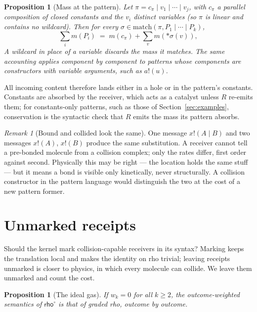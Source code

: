 \documentclass[11pt,a4paper]{article}
\theoremstyle{plain}
\newtheorem{proposition}[theorem]{Proposition}
\theoremstyle{definition}
\theoremstyle{remark}
\newtheorem{remark}[theorem]{Remark}
\newcommand{\rhoc}{\textsf{rho}}
\newcommand{\krho}{\textsf{rho}^{\circ}}
\newcommand{\match}{\mathrm{match}}
\begin{document}
\begin{proposition}[Mass at the pattern]\label{prop:mass}
Let $\pi = c_\pi \mid v_1 \mid \cdots \mid v_j$, with $c_\pi$ a parallel
composition of closed constants and the $v_i$ distinct variables (so $\pi$ is
linear and contains no wildcard). Then for every
$\sigma\in\match(\pi,P_1\mid\cdots\mid P_k)$,
\[
\textstyle\sum_i m(P_i) \;=\; m(c_\pi) + \sum_{v} m(*\sigma(v)),
\]
A wildcard in place of a variable discards the mass it matches. The same
accounting applies component by component to patterns whose components are
constructors with variable arguments, such as $a!(u)$.
\end{proposition}

All incoming content therefore lands either in a hole or in the pattern's
constants. Constants are absorbed by the receiver, which acts as a catalyst
unless $R$ re-emits them; for constants-only patterns, such as those of
Section~\ref{sec:examples}, conservation is the syntactic check that $R$ emits
the mass its pattern absorbs.

\begin{remark}[Bound and collided look the same]\label{rem:bound}
One message $x!(A\mid B)$ and two messages $x!(A)$, $x!(B)$ produce the same
substitution. A receiver cannot tell a pre-bonded molecule from a collision
complex; only the rates differ, first order against second. Physically this may
be right --- the location holds the same stuff --- but it means a bond is visible
only kinetically, never structurally. A collision constructor in the pattern
language would distinguish the two at the cost of a new pattern former.
\end{remark}

\section{Unmarked receipts}\label{sec:unmarked}

Should the kernel mark collision-capable receivers in its syntax? Marking keeps
the translation local and makes the identity on \rhoc{} trivial; leaving
receipts unmarked is closer to physics, in which every molecule can collide. We
leave them unmarked and count the cost.

\begin{proposition}[The ideal gas]\label{prop:ideal}
If $w_k=0$ for all $k\geq2$, the outcome-weighted semantics of $\krho$ is that
of graded \rhoc{}, outcome by outcome.
\end{proposition}
\end{document}
